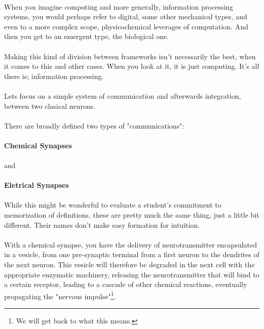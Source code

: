 \documentclass[12pt,  letterpaper]{article}
\begin{document}
\paragraph*{}
When you imagine computing and more generally, information processing systems, you would perhaps refer to digital, some other mechanical types, and even to a more complex scope, physicochemical leverages of computation. And then you get to an emergent type, the biological one.
\paragraph*{}
Making this kind of division between frameworks isn't necessarily the best, when it comes to this and other cases.
When you look at it, it is just computing. It's all there is; information processing.
\paragraph*{}
Lets focus on a simple system of communication and afterwards integration, between two clasical neurons.\paragraph*{}
There are broadly defined two types of "communications":
\paragraph*{}
\textbf{Chemical Synapses}
\paragraph*{}
and
\paragraph*{}
\textbf{Eletrical Synapses}
\paragraph*{}
While this might be wonderful to evaluate a student's commitment to memorization of definitions, these are pretty much the same thing, just a little bit different. Their names don't make easy formation for intuition.\paragraph*{}
With a chemical synapse, you have the delivery of neurotransmitter encapsulated in a vesicle, from one pre-synaptic terminal from a first neuron to the dendrites of the next neuron. This vesicle will therefore be degraded in the next cell with the appropriate enzymatic machinery, releasing the neurotransmitter that will bind to a certain receptor, leading to a cascade of other chemical reactions, eventually propagating the "nervous impulse"\footnote{We will get back to what this means.}.
\end{document}
